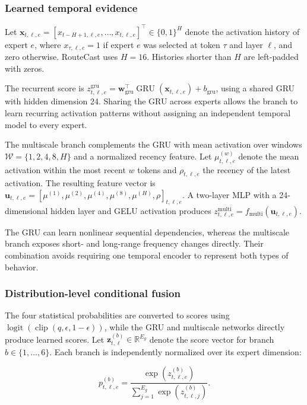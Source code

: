 \documentclass[conference]{IEEEtran}
\begin{document}
\subsubsection{Learned temporal evidence}

Let \(\mathbf{x}_{t,\ell,e}=[x_{t-H+1,\ell,e},\ldots,
x_{t,\ell,e}]^{\top}\in\{0,1\}^{H}\) denote the activation history of expert
\(e\), where
\(x_{\tau,\ell,e}=1\) if expert \(e\) was selected at token \(\tau\) and
layer \(\ell\), and zero otherwise. RouteCast uses \(H=16\). Histories shorter
than \(H\) are left-padded with zeros.

The recurrent score is
\(z_{t,\ell,e}^{\mathrm{gru}}=\mathbf{w}_{\mathrm{gru}}^{\top}
\operatorname{GRU}(\mathbf{x}_{t,\ell,e})+b_{\mathrm{gru}}\), using a shared
GRU \cite{cho2014} with hidden dimension 24. Sharing the GRU across experts
allows the branch to learn recurring activation patterns without assigning an
independent temporal model to every expert.

The multiscale branch complements the GRU with mean activation over windows
\(\mathcal{W}=\{1,2,4,8,H\}\) and a normalized recency feature. Let
\(\mu_{t,\ell,e}^{(w)}\) denote the mean activation within the most recent
\(w\) tokens and \(\rho_{t,\ell,e}\) the recency of the latest activation.
The resulting feature vector is
\(\mathbf{u}_{t,\ell,e}=[\mu^{(1)},\mu^{(2)},\mu^{(4)},\mu^{(8)},
\mu^{(H)},\rho]_{t,\ell,e}\). A two-layer MLP with a 24-dimensional hidden
layer and GELU activation produces
\(z_{t,\ell,e}^{\mathrm{multi}}=f_{\mathrm{multi}}
(\mathbf{u}_{t,\ell,e})\).

The GRU can learn nonlinear sequential dependencies, whereas the multiscale
branch exposes short- and long-range frequency changes directly. Their
combination avoids requiring one temporal encoder to represent both types of
behavior.

\subsubsection{Distribution-level conditional fusion}

The four statistical probabilities are converted to scores using
\(\operatorname{logit}(\operatorname{clip}(q,\epsilon,1-\epsilon))\), while
the GRU and multiscale networks directly produce learned scores. Let
\(\mathbf{z}_{t,\ell}^{(b)}\in\mathbb{R}^{E_g}\) denote the score vector for
branch \(b\in\{1,\ldots,6\}\). Each branch is independently normalized over
its expert dimension:

\begin{equation}
p_{t,\ell,e}^{(b)}
=
\frac{
\exp\!\left(z_{t,\ell,e}^{(b)}\right)
}{
\displaystyle
\sum_{j=1}^{E_g}
\exp\!\left(z_{t,\ell,j}^{(b)}\right)
}.
\label{eq:branch-normalization}
\end{equation}
\end{document}
